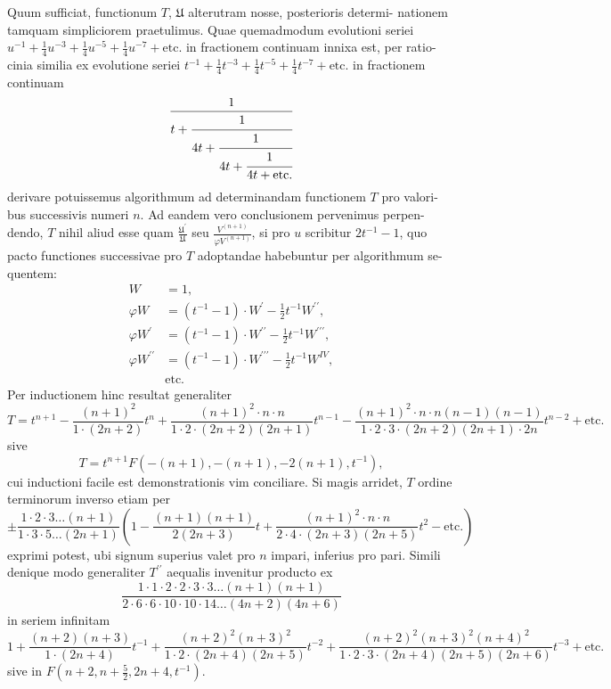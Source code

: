 \documentclass[12pt,a4paper]{article}
\newcommand{\UU}{\mathfrak{U}}
\begin{document}
Quum sufficiat, functionum $T$, $\UU$ alterutram nosse, posterioris determi-
nationem tamquam simpliciorem praetulimus. Quae quemadmodum evolutioni
seriei $u^{-1} + \tfrac{1}{4}u^{-3} + \tfrac{1}{4}u^{-5} + \tfrac{1}{4}u^{-7} + \text{etc.}$ in fractionem continuam innixa est, per ratio-
cinia similia ex evolutione seriei $t^{-1} + \tfrac{1}{4}t^{-3} + \tfrac{1}{4}t^{-5} + \tfrac{1}{4}t^{-7} + \text{etc.}$ in fractionem
continuam
\[
\frac{1}{t + \cfrac{1}{4t + \cfrac{1}{4t + \cfrac{1}{4t + \text{etc.}}}}}
\]
derivare potuissemus algorithmum ad determinandam functionem $T$ pro valori-
bus successivis numeri $n$. Ad eandem vero conclusionem pervenimus perpen-
dendo, $T$ nihil aliud esse quam $\frac{\UU^\prime}{\UU}$ seu $\frac{V^{(n+1)}}{\varphi V^{(n+1)}}$, si pro $u$ scribitur $2t^{-1} - 1$, quo
pacto functiones successivae pro $T$ adoptandae habebuntur per algorithmum se-
quentem:
\begin{align*}
W &= 1,\\
\varphi W &= (t^{-1} - 1) \cdot W^\prime - \tfrac{1}{2}t^{-1} W^{\prime\prime}, \\
\varphi W^\prime &= (t^{-1} - 1) \cdot W^{\prime\prime} - \tfrac{1}{2}t^{-1} W^{\prime\prime\prime},\\
\varphi W^{\prime\prime} &= (t^{-1} - 1) \cdot W^{\prime\prime\prime} - \tfrac{1}{2}t^{-1} W^{IV},\\
&\text{etc.}
\end{align*}
Per inductionem hinc resultat generaliter
\[
T = t^{n+1} - \frac{(n+1)^2}{1 \cdot (2n+2)} t^n + \frac{(n+1)^2 \cdot n \cdot n}{1 \cdot 2 \cdot (2n+2)(2n+1)} t^{n-1} - \frac{(n+1)^2 \cdot n \cdot n(n-1)(n-1)}{1 \cdot 2 \cdot 3 \cdot (2n+2)(2n+1) \cdot 2n} t^{n-2} + \text{etc.}
\]
sive
\[
T = t^{n+1} F(-(n+1), -(n+1), -2(n+1), t^{-1}),
\]
cui inductioni facile est demonstrationis vim conciliare. Si magis arridet, $T$ ordine terminorum inverso etiam per
\[
\pm \frac{1 \cdot 2 \cdot 3 \ldots (n+1)}{1 \cdot 3 \cdot 5 \ldots (2n+1)} \left(1 - \frac{(n+1)(n+1)}{2(2n+3)} t + \frac{(n+1)^2 \cdot n \cdot n}{2 \cdot 4 \cdot (2n+3)(2n+5)} t^2 - \text{etc.}\right)
\]
exprimi potest, ubi signum superius valet pro $n$ impari, inferius pro pari. Simili denique modo generaliter $T^{\prime\prime}$ aequalis invenitur producto ex
\[
\frac{1 \cdot 1 \cdot 2 \cdot 2 \cdot 3 \cdot 3 \ldots (n+1)(n+1)}{2 \cdot 6 \cdot 6 \cdot 10 \cdot 10 \cdot 14 \ldots (4n+2)(4n+6)}
\]
in seriem infinitam
\[
1 + \frac{(n+2)(n+3)}{1 \cdot (2n+4)} t^{-1} + \frac{(n+2)^2(n+3)^2}{1 \cdot 2 \cdot (2n+4)(2n+5)} t^{-2} + \frac{(n+2)^2(n+3)^2(n+4)^2}{1 \cdot 2 \cdot 3 \cdot (2n+4)(2n+5)(2n+6)} t^{-3} + \text{etc.}
\]
sive in $F(n+2, n+\tfrac{5}{2}, 2n+4, t^{-1})$.
\end{document}
